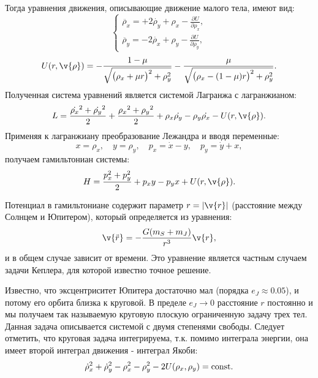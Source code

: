 Тогда уравнения движения, описывающие движение малого тела, имеют вид:
\begin{equation*}
 \begin{cases}
   \ddot{\rho_x}=+2 \dot{\rho_y} + \rho_x - \frac{\partial U}{\partial \rho_x}, \\
   \ddot{\rho_y}=-2 \dot{\rho_x} + \rho_y - \frac{\partial U}{\partial \rho_y},
 \end{cases}
\end{equation*}
$$U(r, \v{\rho}) = - \frac{1-\mu}{\sqrt{\big(\rho_x + \mu r \big)^2 + \rho_y^2}} - \frac{\mu}{\sqrt{\big(\rho_x - (1-  \mu ) r \big)^2 + \rho_y^2}}.$$
Полученная система уравнений является системой Лагранжа с лагранжианом:
$$L = \frac{\dot{\rho_x}^2 + \dot{\rho_y}^2}{2} + \frac{{\rho_x}^2 + {\rho_y}^2}{2} + \rho_x \dot{\rho_y} - \rho_y \dot{\rho_x} - U(r,\v{\rho}) .$$
Применяя к лагранжиану преобразование Лежандра и вводя переменные:
$$
x = \rho_x,\quad
y = \rho_y,\quad
p_x = \dot{x} - y,\quad
p_y = \dot{y} + x,
$$
получаем гамильтониан системы:
$$H = \frac{p_x^2 + p_y^2}{2} + p_xy - p_yx + U(r,\v{\rho}).$$

Потенциал в гамильтониане содержит параметр $r = |\v{r}|$ (расстояние между Солнцем и Юпитером), который определяется из уравнения:
$$\v{\ddot{r}} = -\frac{G(m_S+m_J)}{r^3} \v{r},$$
и в общем случае зависит от времени. Это уравнение является частным случаем задачи Кеплера, для которой известно точное решение. 

Известно, что эксцентриситет Юпитера достаточно мал (порядка $e_{J}\approx 0.05$), и потому его орбита близка к круговой. В пределе $e_{J}\to 0$ расстояние $r$ постоянно и мы получаем так называемую круговую плоскую ограниченную задачу трех тел. Данная задача описывается системой с двумя степенями свободы. Следует отметить, что круговая задача интегрируема, т.к. помимо интеграла энергии, она имеет второй интеграл движения - интеграл Якоби:
$$
\dot \rho_{x}^{2} + \dot \rho_{y}^{2} - \rho_{x}^{2} - \rho_{y}^{2} - 2 U(\rho_{x}, \rho_{y}) = {\rm const}.
$$

